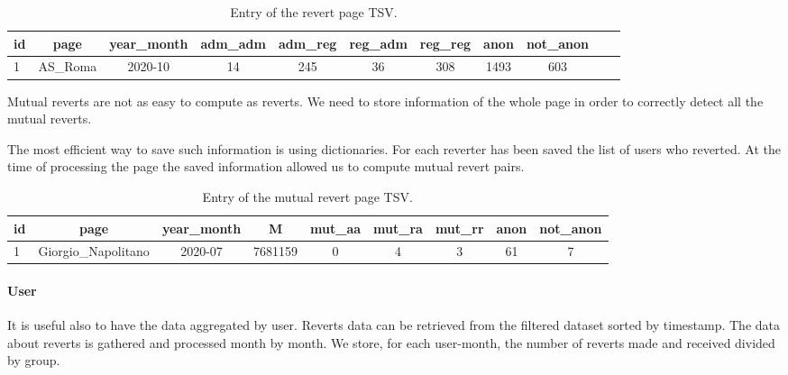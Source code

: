 \begin{table}[H]
    \centering
    \begin{tabularx}{\columnwidth}{@{}Xcccccccccc@{}}
        \midrule
        \textbf{id} & \textbf{page} & \textbf{year\_month} & \textbf{adm\_adm} & \textbf{adm\_reg} & \textbf{reg\_adm} & \textbf{reg\_reg} & \textbf{anon} & \textbf{not\_anon}\\ \toprule
        1 & AS\_Roma & 2020-10 & 14 & 245 & 36 & 308 & 1493 & 603 \\
        
         \bottomrule
    \end{tabularx}
    
    \caption{Entry of the revert page TSV. \label{table:revertpage}}
\end{table}

Mutual reverts are not as easy to compute as reverts. We need to store information of the whole page
in order to correctly detect all the mutual reverts.

The most efficient way to save such information is using dictionaries. For each reverter has been
saved the list of users who reverted. At the time of processing the page the saved information
allowed us to compute mutual revert pairs.

\begin{table}[H]
    \centering
    \begin{tabularx}{\columnwidth}{@{}Xcccccccc@{}}
        \midrule
        \textbf{id} & \textbf{page} & \textbf{year\_month} & \textbf{M}& \textbf{mut\_aa} & \textbf{mut\_ra}  & \textbf{mut\_rr} & \textbf{anon} & \textbf{not\_anon}\\ \toprule
        1 & Giorgio\_Napolitano & 2020-07 & 7681159 & 0 & 4  & 3 & 61 & 7 \\
         \bottomrule
    \end{tabularx}
    
    \caption{Entry of the mutual revert page TSV. \label{table:mutualpage}}
\end{table}

\paragraph*{User}
It is useful also to have the data aggregated by user. Reverts data can be retrieved from the
filtered dataset sorted by timestamp. The data about reverts is gathered and processed month by
month. We store, for each user-month, the number of reverts made and received divided by group.

